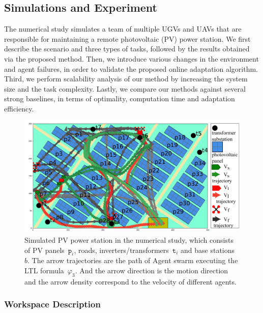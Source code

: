 \subsection{Simulations and Experiment}\label{subsec:simulation}

The numerical study simulates a team of multiple UGVs and UAVs
that are responsible for maintaining a remote photovoltaic (PV) power station.
We first describe the scenario and three types of tasks,
followed by the results obtained via the proposed method.
Then, we introduce various changes in the environment and agent failures,
in order to validate the proposed online adaptation algorithm.
Third, we perform scalability analysis of our method by increasing
the system size and the task complexity.
Lastly, we compare our methods against several strong baselines, in terms of
optimality, computation time and adaptation efficiency.


\begin{figure}
\includegraphics[scale=0.18]{figures/background3.pdf}
\caption{Simulated PV power station in the numerical study,
  which consists of PV panels~$\texttt{p}_i$, roads,
  inverters/transformers~$\texttt{t}_i$ and base stations~$b$.
  The arrow trajectories are the path of Agent swarm
  executing the LTL formula~$\varphi_{3}$. And the arrow direction
  is the motion direction and the arrow density correspond to the velocity of different agents.}
\label{fig:workspace}
\end{figure}

\subsubsection{Workspace Description}\label{subsubsec:ws}

